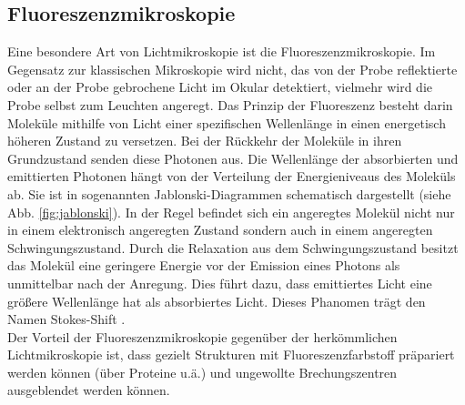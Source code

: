 \subsection{Fluoreszenzmikroskopie}
Eine besondere Art von Lichtmikroskopie ist die Fluoreszenzmikroskopie.
Im Gegensatz zur klassischen Mikroskopie wird nicht, das von der Probe reflektierte oder an der Probe gebrochene Licht im Okular detektiert, vielmehr wird die Probe selbst zum Leuchten angeregt.
Das Prinzip der Fluoreszenz besteht darin Moleküle mithilfe von Licht einer spezifischen Wellenlänge in einen energetisch höheren Zustand zu versetzen. 
Bei der Rückkehr der Moleküle in ihren Grundzustand senden diese Photonen aus. 
Die Wellenlänge der absorbierten und emittierten Photonen hängt von der Verteilung der Energieniveaus des Moleküls ab. Sie ist in sogenannten Jablonski-Diagrammen schematisch dargestellt (siehe Abb. \ref{fig:jablonski}).
In der Regel befindet sich ein angeregtes Molekül nicht nur in einem elektronisch angeregten Zustand sondern auch in einem angeregten Schwingungszustand.
Durch die Relaxation aus dem Schwingungszustand besitzt das Molekül eine geringere Energie vor der Emission eines Photons als unmittelbar nach der Anregung.
Dies führt dazu, dass emittiertes Licht eine größere Wellenlänge hat als absorbiertes Licht. Dieses Phanomen trägt den Namen Stokes-Shift \cite{haken}.
\\
Der Vorteil der Fluoreszenzmikroskopie gegenüber der herkömmlichen Lichtmikroskopie ist, dass gezielt Strukturen mit Fluoreszenzfarbstoff präpariert werden können (über Proteine u.ä.) und ungewollte Brechungszentren ausgeblendet werden können.
